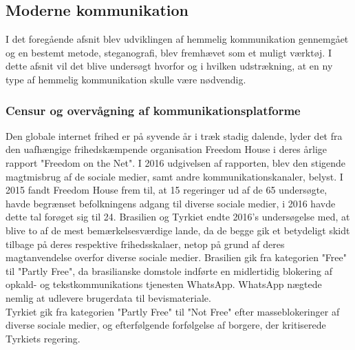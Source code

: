 \subsection{Moderne kommunikation}
I det foregående afsnit blev udviklingen af hemmelig kommunikation gennemgået og en bestemt metode, steganografi, blev fremhævet som et muligt værktøj. I dette afsnit vil det blive undersøgt hvorfor og i hvilken udstrækning, at en ny type af hemmelig kommunikation skulle være nødvendig.

\subsubsection{Censur og overvågning af kommunikationsplatforme}
Den globale internet frihed er på syvende år i træk stadig dalende\cite{FreedomHouseRapport2017}, lyder det fra den uafhængige frihedskæmpende organisation Freedom House i deres årlige rapport "Freedom on the Net".
I 2016 udgivelsen af rapporten, blev den stigende magtmisbrug af de sociale medier, samt andre kommunikationskanaler, belyst. I 2015 fandt Freedom House frem til, at 15 regeringer ud af de 65 undersøgte, havde begrænset befolkningens adgang til diverse sociale medier, i 2016 havde dette tal forøget sig til 24. Brasilien og Tyrkiet endte 2016's undersøgelse med, at blive to af de mest bemærkelsesværdige lande, da de begge gik et betydeligt skidt tilbage på deres respektive frihedsskalaer, netop på grund af deres magtanvendelse overfor diverse sociale medier. Brasilien gik fra kategorien "Free" til "Partly Free", da brasilianske domstole indførte en midlertidig blokering af opkald- og tekstkommunikations tjenesten WhatsApp. WhatsApp nægtede nemlig at udlevere brugerdata til bevismateriale.\\ 
Tyrkiet gik fra kategorien "Partly Free" til "Not Free" efter masseblokeringer af diverse sociale medier, og efterfølgende forfølgelse af borgere, der kritiserede Tyrkiets regering.\cite{FreedomHouseRapport2016}\\

